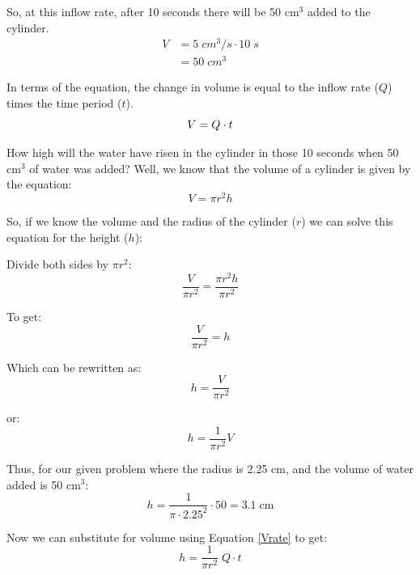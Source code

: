 \documentclass[11pt,fleqn]{book}
\begin{document}
		      
	So, at this inflow rate, after 10 seconds there will be 50 cm$^3$ added to the cylinder.
		\begin{align*}
			 V &= 5 \; cm^3/s \cdot 10 \; s \\
					&= 50 \; cm^3
		\end{align*}
	
	In terms of the equation, the change in volume is equal to the inflow rate ($Q$) times the time period ($ t$).
	  \begin{equation}
	  	\label{Vrate}
	  	 V = Q \cdot t \\
	  \end{equation}
	
	How high will the water have risen in the cylinder in those 10 seconds when 50 cm$^3$ of water was added? Well, we know that the volume of a cylinder is given by the equation:
		\begin{equation}
			V = \pi r^2 h
		\end{equation}
	
	So, if we know the volume and the radius of the cylinder ($r$) we can solve this equation for the height ($h$):
	
	Divide both sides by $\pi r^2$:
		\begin{equation}
			\frac{V}{\pi r^2} = \frac{\pi r^2 h}{\pi r^2}
		\end{equation}
	
	To get:
		\begin{equation}
			\frac{V}{\pi r^2} = h 
		\end{equation}
	
	Which can be rewritten as:
		\begin{equation}
			h = \frac{V}{\pi r^2}  
		\end{equation}
	
	or:
		\begin{equation}
			h = \frac{1}{\pi r^2} V
		\end{equation}
	
	Thus, for our given problem where the radius is 2.25 cm, and the volume of water added is 50 cm$^3$:
		\begin{equation}
			h = \frac{1}{\pi \cdot 2.25^2} \cdot 50 = 3.1 \; \text{cm}
		\end{equation}
	
	
	Now we can substitute for volume using Equation \ref{Vrate} to get:
		\begin{equation}
			h = \frac{1}{\pi r^2} \; Q \cdot t
		\end{equation}
	
\end{document}
